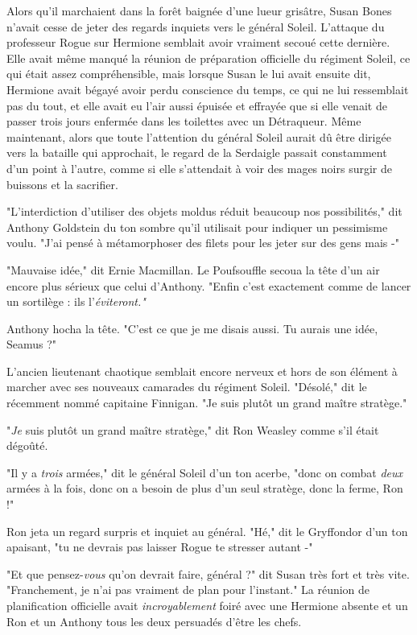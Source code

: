 Alors qu'il marchaient dans la forêt baignée d'une lueur grisâtre, Susan Bones n'avait cesse de jeter des regards inquiets vers le général Soleil. L'attaque du professeur Rogue sur Hermione semblait avoir vraiment secoué cette dernière. Elle avait même manqué la réunion de préparation officielle du régiment Soleil, ce qui était assez compréhensible, mais lorsque Susan le lui avait ensuite dit, Hermione avait bégayé avoir perdu conscience du temps, ce qui ne lui ressemblait pas du tout, et elle avait eu l'air aussi épuisée et effrayée que si elle venait de passer trois jours enfermée dans les toilettes avec un Détraqueur. Même maintenant, alors que toute l'attention du général Soleil aurait dû être dirigée vers la bataille qui approchait, le regard de la Serdaigle passait constamment d'un point à l'autre, comme si elle s'attendait à voir des mages noirs surgir de buissons et la sacrifier.

"L'interdiction d'utiliser des objets moldus réduit beaucoup nos possibilités," dit Anthony Goldstein du ton sombre qu'il utilisait pour indiquer un pessimisme voulu. "J'ai pensé à métamorphoser des filets pour les jeter sur des gens mais -"

"Mauvaise idée," dit Ernie Macmillan. Le Poufsouffle secoua la tête d'un air encore plus sérieux que celui d'Anthony. "Enfin c'est exactement comme de lancer un sortilège : ils l'\emph{éviteront."} 

Anthony hocha la tête. "C'est ce que je me disais aussi. Tu aurais une idée, Seamus ?"

L'ancien lieutenant chaotique semblait encore nerveux et hors de son élément à marcher avec ses nouveaux camarades du régiment Soleil. "Désolé," dit le récemment nommé capitaine Finnigan. "Je suis plutôt un grand maître stratège."

"\emph{Je}  suis plutôt un grand maître stratège," dit Ron Weasley comme s'il était dégoûté.

"Il y a \emph{trois}  armées," dit le général Soleil d'un ton acerbe, "donc on combat \emph{deux}  armées à la fois, donc on a besoin de plus d'un seul stratège, donc la ferme, Ron !"

Ron jeta un regard surpris et inquiet au général. "Hé," dit le Gryffondor d'un ton apaisant, "tu ne devrais pas laisser Rogue te stresser autant -"

"Et que pensez-\emph{vous}  qu'on devrait faire, général ?" dit Susan très fort et très vite. "Franchement, je n'ai pas vraiment de plan pour l'instant." La réunion de planification officielle avait \emph{incroyablement}  foiré avec une Hermione absente et un Ron et un Anthony tous les deux persuadés d'être les chefs.

